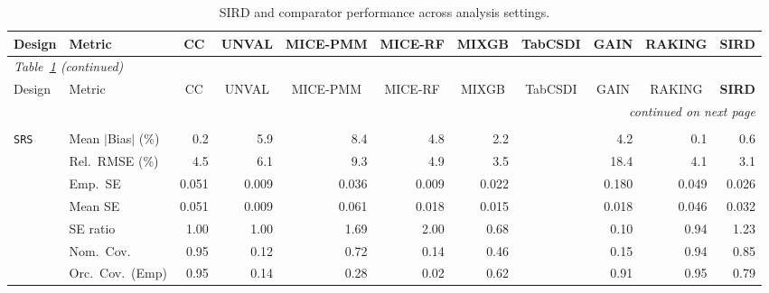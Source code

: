 \begin{landscape}
\footnotesize\setlength{\tabcolsep}{3.5pt}
\begin{longtable}{llrrrrrrrrr}
\caption{SIRD and comparator performance across analysis settings.}
\label{tab:appc_surv_SampleOE} \\
\toprule
Design & Metric & \multicolumn{1}{c}{CC} & \multicolumn{1}{c}{UNVAL} & \multicolumn{1}{c}{MICE-PMM} & \multicolumn{1}{c}{MICE-RF} & \multicolumn{1}{c}{MIXGB} & \multicolumn{1}{c}{TabCSDI} & \multicolumn{1}{c}{GAIN} & \multicolumn{1}{c}{RAKING} & \multicolumn{1}{c}{\textbf{SIRD}} \\
\midrule \endfirsthead
\multicolumn{11}{l}{\footnotesize\itshape Table~\ref{tab:appc_surv_SampleOE} (continued)} \\
\toprule
Design & Metric & \multicolumn{1}{c}{CC} & \multicolumn{1}{c}{UNVAL} & \multicolumn{1}{c}{MICE-PMM} & \multicolumn{1}{c}{MICE-RF} & \multicolumn{1}{c}{MIXGB} & \multicolumn{1}{c}{TabCSDI} & \multicolumn{1}{c}{GAIN} & \multicolumn{1}{c}{RAKING} & \multicolumn{1}{c}{\textbf{SIRD}} \\
\midrule \endhead
\midrule \multicolumn{11}{r}{\footnotesize\itshape continued on next page} \\
\endfoot
\bottomrule \endlastfoot
\multicolumn{11}{l}{\textbf{Continuous Phase-Two Covariates}} \\
\addlinespace[2pt]
\quad \texttt{SRS} & Mean $|$Bias$|$ (\%) & \cellcolor{ranktwo}0.2 & 5.9 & 8.4 & 4.8 & 2.2 &  & 4.2 & \cellcolor{rankone}0.1 & \cellcolor{rankthree}0.6 \\
 & Rel.\ RMSE (\%) & 4.5 & 6.1 & 9.3 & 4.9 & \cellcolor{ranktwo}3.5 &  & 18.4 & \cellcolor{rankthree}4.1 & \cellcolor{rankone}3.1 \\
 & Emp.\ SE & 0.051 & 0.009 & 0.036 & 0.009 & 0.022 &  & 0.180 & 0.049 & 0.026 \\
 & Mean SE & 0.051 & 0.009 & 0.061 & 0.018 & 0.015 &  & 0.018 & 0.046 & 0.032 \\
 & SE ratio & \cellcolor{rankone}1.00 & \cellcolor{rankone}1.00 & 1.69 & 2.00 & 0.68 &  & 0.10 & \cellcolor{ranktwo}0.94 & \cellcolor{rankthree}1.23 \\
 & Nom.\ Cov. & \cellcolor{rankone}0.95 & 0.12 & 0.72 & 0.14 & 0.46 &  & 0.15 & \cellcolor{ranktwo}0.94 & \cellcolor{rankthree}0.85 \\
 & Orc.\ Cov.\ (Emp) & \cellcolor{rankone}0.95 & 0.14 & 0.28 & 0.02 & 0.62 &  & \cellcolor{ranktwo}0.91 & \cellcolor{rankone}0.95 & \cellcolor{rankthree}0.79 \\

\end{longtable}
\end{landscape}
